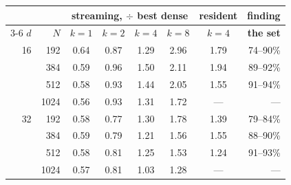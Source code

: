 \begin{tabular}{rrcccccr}
\toprule
& & \multicolumn{4}{c}{\textbf{streaming}, $\div$ best dense} & \textbf{resident} & \textbf{finding} \\
\cmidrule(lr){3-6}
$d$ & $N$ & $k{=}1$ & $k{=}2$ & $k{=}4$ & $k{=}8$ & $k{=}4$ & \textbf{the set} \\
\midrule
16 & 192 & 0.64 & 0.87 & 1.29 & 2.96 & 1.79 & 74--90\% \\
 & 384 & 0.59 & 0.96 & 1.50 & 2.11 & 1.94 & 89--92\% \\
 & 512 & 0.58 & 0.93 & 1.44 & 2.05 & 1.55 & 91--94\% \\
 & 1024 & 0.56 & 0.93 & 1.31 & 1.72 & --- & --- \\
\midrule
32 & 192 & 0.58 & 0.77 & 1.30 & 1.78 & 1.39 & 79--84\% \\
 & 384 & 0.59 & 0.79 & 1.21 & 1.56 & 1.55 & 88--90\% \\
 & 512 & 0.58 & 0.81 & 1.25 & 1.53 & 1.24 & 91--93\% \\
 & 1024 & 0.57 & 0.81 & 1.03 & 1.28 & --- & --- \\
\bottomrule
\end{tabular}%
